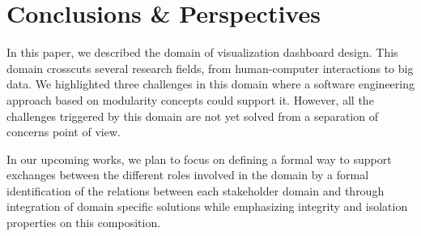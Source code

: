 \documentclass{sigplanconf}
\begin{document}
\section{Conclusions \& Perspectives}
In this paper, we described the domain of visualization dashboard
design. This domain crosscuts several research fields, from
human-computer interactions to big data. We highlighted three
challenges in this domain where a software engineering approach based
on modularity concepts could support it. However, all the challenges
triggered by this domain are not yet solved from a separation of
concerns point of view.

In our upcoming works, we plan to focus on
defining a formal way to support exchanges between the different roles
involved in the domain by a formal identification of the relations
between each stakeholder domain and
through integration of domain specific solutions
while emphasizing integrity and isolation properties on this composition.





%
\end{document}
